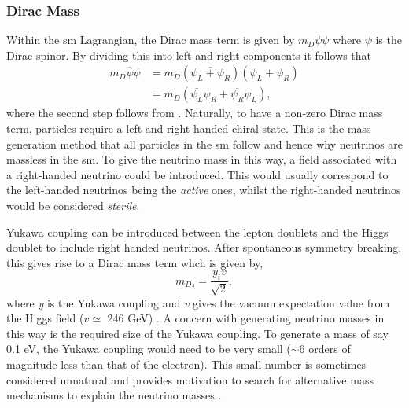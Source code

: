 \subsubsection{Dirac Mass}
Within the \gls{sm} Lagrangian, the Dirac mass term is given by $m_D\overline{\psi}\psi$ where $\psi$ is the Dirac spinor. By dividing this into left and right components it follows that
\begin{equation}\label{eqn:Dirac mass term}
\begin{split}
    m_D\overline{\psi}\psi &= m_D(\overline{\psi_L + \psi_R})(\psi_L + \psi_R) \\
    &= m_D(\overline{\psi_L}\psi_R + \overline{\psi_R}\psi_L),
\end{split}
\end{equation} 
where the second step follows from . Naturally, to have a non-zero Dirac mass term, particles require a left and right-handed chiral state. This is the mass generation method that all particles in the \gls{sm} follow and hence why neutrinos are massless in the \gls{sm}. To give the neutrino mass in this way, a field associated with a right-handed neutrino could be introduced. This would usually correspond to the left-handed neutrinos being the \textit{active} ones, whilst the right-handed neutrinos would be considered \textit{sterile}.

Yukawa coupling can be introduced between the lepton doublets and the Higgs doublet to include right handed neutrinos. After spontaneous symmetry breaking, this gives rise to a Dirac mass term whch is given by, \begin{equation}
    {m_D}_i = \frac{y_iv}{\sqrt{2}},
\end{equation}
where \textit{y} is the Yukawa coupling and \textit{v} gives the vacuum expectation value from the Higgs field ($v \simeq$ 246 GeV) \cite{peskin_and_schroeder}. A concern with generating neutrino masses in this way is the required size of the Yukawa coupling. To generate a mass of say 0.1 eV, the Yukawa coupling would need to be very small ($\sim$6 orders of magnitude less than that of the electron). This small number is sometimes considered unnatural and provides motivation to search for alternative mass mechanisms to explain the neutrino masses \cite{Fundamentals_of_Neutrino_Physics_and_Astrophysics}.

